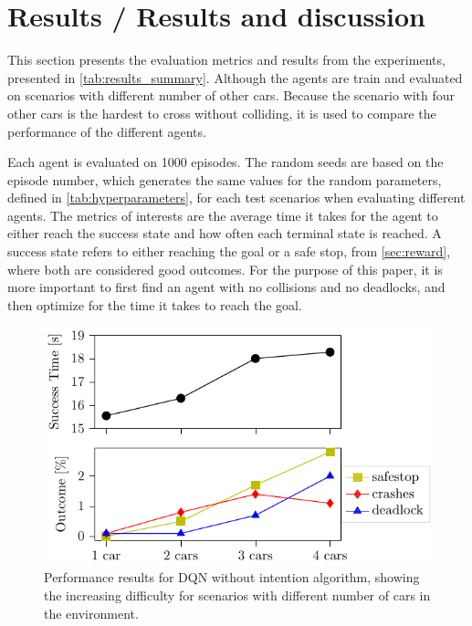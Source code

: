 \section{Results / Results and discussion}
\label{sec:results}
This section presents the evaluation metrics and results from the experiments, presented in \ref{tab:results_summary}. Although the agents are train and evaluated on scenarios with different number of other cars. Because the scenario with four other cars is the hardest to cross without colliding, it is used to compare the performance of the different agents.

Each agent is evaluated on \num{1000} episodes. The random seeds are based on the episode number, which generates the same values for the random parameters, defined in \ref{tab:hyperparameters}, for each test scenarios when evaluating different agents.
The metrics of interests are the average time it takes for the agent to either reach the success state and how often each terminal state is reached. A success state refers to either reaching the goal or a safe stop, from \ref{sec:reward}, where both are considered good outcomes. For the purpose of this paper, it is more important to first find an agent with no collisions and no deadlocks, and then optimize for the time it takes to reach the goal. 

\begin{figure}[!t]
    \centering
        \includegraphics[width=0.99\columnwidth]{figures/figures-1-4cars.pdf}
        \caption{Performance results for DQN without intention algorithm, showing the increasing difficulty for scenarios with different number of cars in the environment.}
    \label{fig:number_cars}
\end{figure}


